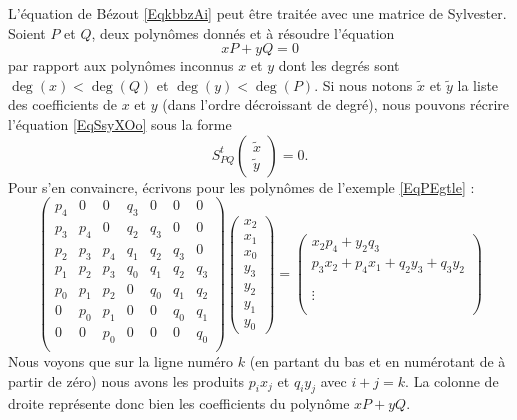 L'équation de Bézout \eqref{EqkbbzAi} peut être traitée avec une matrice de Sylvester. Soient \( P\) et \( Q\), deux polynômes donnés et à résoudre l'équation
\begin{equation}    \label{EqSsyXOo}
    xP+yQ=0
\end{equation}
par rapport aux polynômes inconnus \( x\) et \( y\) dont les degrés sont \( \deg(x)<\deg(Q)\) et \( \deg(y)<\deg(P)\). Si nous notons \( \tilde x\) et \( \tilde y\) la liste des coefficients de \( x\) et \( y\) (dans l'ordre décroissant de degré), nous pouvons récrire l'équation \eqref{EqSsyXOo} sous la forme
\begin{equation}
    S_{PQ}^t\begin{pmatrix}
        \tilde x    \\
        \tilde y
    \end{pmatrix}=0.
\end{equation}
Pour s'en convaincre, écrivons pour les polynômes de l'exemple \eqref{EqPEgtle} :
\begin{equation}
    \begin{pmatrix}
        p_4    &   0    &   0    &   q_3    &   0    &   0    &   0\\
        p_3    &   p_4    &   0    &   q_2    &   q_3    &   0    &   0\\
        p_2    &   p_3    &   p_4    &   q_1    &   q_2    &   q_3    &   0\\
        p_1    &   p_2    &   p_3    &   q_0    &   q_1    &   q_2    &   q_3\\
        p_0    &   p_1    &   p_2    &   0    &   q_0    &   q_1    &   q_2\\
        0    &   p_0    &   p_1    &   0    &   0    &   q_0    &   q_1\\
        0    &   0    &   p_0    &   0    &   0    &   0    &   q_0\\
    \end{pmatrix}\begin{pmatrix}
        x_2    \\
        x_1  \\
        x_0  \\
        y_3   \\
        y_2    \\
        y_1    \\
        y_0
    \end{pmatrix}=
    \begin{pmatrix}
        x_2p_4+y_2q_3    \\
        p_3x_2+p_4x_1+q_2y_3+q_3y_2  \\
          \\
           \\
        \vdots    \\
            \\

    \end{pmatrix}
\end{equation}
Nous voyons que sur la ligne numéro \( k\) (en partant du bas et en numérotant de à partir de zéro) nous avons les produits \( p_ix_j\) et \( q_iy_j\) avec \( i+j=k\). La colonne de droite représente donc bien les coefficients du polynôme \( xP+yQ\).


